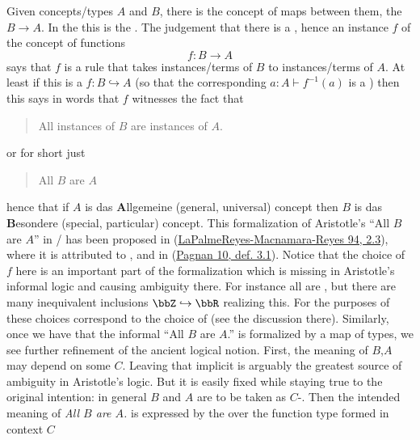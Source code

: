 Given concepts/types $A$ and $B$, there is the concept of maps between them, the  $B\to A$. In the  this is the .
The judgement that there is a , hence an instance $f$ of the concept of functions
\begin{displaymath}
f \colon B \longrightarrow A
\end{displaymath}
says that $f$ is a rule that takes instances/terms of $B$ to instances/terms of $A$. At least if this is a  $f \colon B \hookrightarrow A$ (so that the corresponding $a\colon A \vdash f^{-1}(a)$ is a ) then this says in words that $f$ witnesses the fact that
\begin{quote}%
All instances of $B$ are instances of $A$.
\end{quote}
or for short just
\begin{quote}%
All $B$ are $A$
\end{quote}
hence that if $A$ is das \textbf{A}llgemeine (general, universal) concept then $B$ is das \textbf{B}esondere (special, particular) concept.
This formalization of Aristotle's ``All $B$ are $A$'' in / has been proposed in (\hyperlink{PalmeReyesMacnamaraReyes94}{LaPalmeReyes-Macnamara-Reyes 94, 2.3}), where it is attributed to , and in (\hyperlink{Pagnan10}{Pagnan 10, def. 3.1}).
Notice that the choice of $f$ here is an important part of the formalization which is missing in Aristotle's informal logic and causing ambiguity there.
For instance all  are , but there are many inequivalent  inclusions $\bbZ\hookrightarrow \bbR$ realizing this. For the purposes of  these choices correspond to the choice of  (see the discussion there).
Similarly, once we have that the informal ``All $B$ are $A$.'' is formalized by a map of types, we see further refinement of the ancient logical notion.
First, the meaning of $B$,$A$ may depend on some  $C$. Leaving that implicit is arguably the greatest source of ambiguity in Aristotle's logic. But it is easily fixed while staying true to the original intention: in general $B$ and $A$ are to be taken as $C$-. Then the intended meaning of \emph{All $B$ are $A$.} is expressed by the  over the function type formed in context $C$
